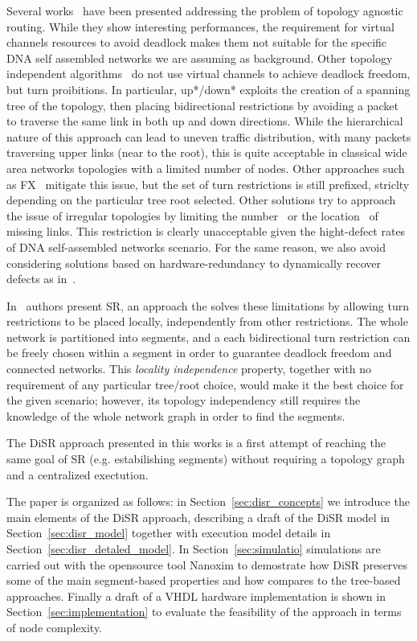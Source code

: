 Several works~\cite{sancho2002, skeie2002, skeie2004, koibuchi2003} have been presented addressing the problem of topology
agnostic routing. While they show interesting
performances, the requirement for virtual channels resources 
to avoid deadlock makes them not suitable for the specific DNA self
assembled networks we are assuming as background.
Other topology independent algorithms~\cite{schroeder1991, koibuchi2001, cherkasova1996} do not use virtual channels to
achieve deadlock freedom, but turn proibitions. 
In particular, up*/down* exploits the creation of a spanning tree of the
topology, then placing bidirectional restrictions by avoiding a packet
to traverse the same link in both up and down directions.
While the hierarchical nature of this approach can lead to uneven traffic
distribution, with many packets traversing upper links (near to the
root), this is quite acceptable in classical wide area networks
topologies with a limited number of nodes. Other approaches such as
FX~\cite{sancho2000} mitigate this
issue, but the set of turn restrictions is still prefixed,
striclty depending on the particular tree root selected. 
Other solutions try to approach the issue of irregular
topologies by limiting the number~\cite{dally1994, duato1997, gomez2004, koibuchi2008} or the
location~\cite{zhang2008, sui2000, flich2008, liu2011} of missing links. This
restriction is clearly unacceptable given the hight-defect rates of
DNA self-assembled networks scenario. For the same reason, we also
avoid considering solutions based on hardware-redundancy to
dynamically recover defects as in~\cite{constantinides2006, kohler2010, kim2006, park2006}. 

In~\cite{mejia_ipdps06} authors present SR, an approach the solves these
limitations by allowing turn restrictions to be placed locally,
independently from other restrictions. The whole network is
partitioned into segments, and a each bidirectional turn
restriction can be freely chosen within a segment in order to guarantee
deadlock freedom and connected networks. This \emph{locality
independence} property, together with no requirement of any particular tree/root
choice, would make it the best choice for the given scenario;
however, its topology independency still requires the knowledge of the
whole network graph in order to find the segments. 

The DiSR approach presented in this works is a first attempt of
reaching the same goal of SR (e.g. estabilishing segments) without
requiring a topology graph and a centralized exectution.

The paper is organized as follows: in Section~\ref{sec:disr_concepts}
we introduce the main elements of the DiSR approach, describing  
a draft of the DiSR model in Section~\ref{sec:disr_model}
together with execution model details in Section~\ref{sec:disr_detaled_model}.
In Section~\ref{sec:simulatio} simulations are carried out with the opensource tool Nanoxim
to demostrate how DiSR preserves some of the main segment-based
properties and how compares to the tree-based approaches. Finally a
draft of a VHDL hardware implementation is shown in
Section~\ref{sec:implementation} to evaluate the feasibility of the
approach in terms of node complexity.


